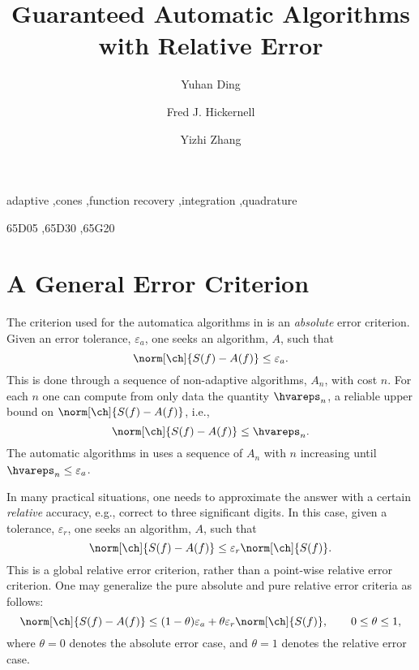\documentclass[]{elsarticle}
\theoremstyle{definition}
\theoremstyle{remark}
\begin{document}
\begin{frontmatter}

\title{Guaranteed Automatic Algorithms with Relative Error}
\author{Yuhan Ding}
\author{Fred J. Hickernell}
\author{Yizhi Zhang}
\address{Room E1-208, Department of Applied Mathematics, Illinois Institute of Technology,\\ 10 W.\ 32$^{\text{nd}}$ St., Chicago, IL 60616}
\begin{abstract}
\end{abstract}

\begin{keyword}
adaptive \sep cones \sep function recovery \sep integration \sep quadrature

\MSC[2010] 65D05 \sep 65D30 \sep 65G20

\end{keyword}
\end{frontmatter}


\section{A General Error Criterion} \label{relerrsec}

The criterion used for the automatica algorithms in \cite{HicEtal14b} is an \emph{absolute} error criterion. Given an error tolerance, $\varepsilon_a$, one seeks an algorithm, $A$, such that
\begin{equation} \label{abserrcrit}
\norm[\ch]{S(f)-A(f)} \le \varepsilon_a.
\end{equation}
This is done through a sequence of non-adaptive algorithms, $A_n$, with cost $n$.  For each $n$ one can compute from only data the quantity $\hvareps_n$, a reliable upper bound on $\norm[\ch]{S(f)-A(f)}$, i.e.,
\begin{equation} \label{hatvareps}
\norm[\ch]{S(f)-A(f)} \le \hvareps_n.
\end{equation}
The automatic algorithms in \cite{HicEtal14b} uses a sequence of $A_n$ with $n$ increasing until $\hvareps_n \le \varepsilon_a$.

In many practical situations, one needs to approximate the answer with a certain \emph{relative} accuracy, e.g., correct to three significant digits.  In this case, given a tolerance, $\varepsilon_r$, one seeks an algorithm, $A$, such that
\begin{equation} \label{globalrelerrcrit}
\norm[\ch]{S(f)-A(f)} \le \varepsilon_r \norm[\ch]{S(f)}.
\end{equation}
This is a global relative error criterion, rather than a point-wise relative error criterion.  One may generalize the pure absolute and pure relative error criteria as follows:
\begin{equation} \label{globalgenerrcrit}
\norm[\ch]{S(f)-A(f)} \le (1-\theta)\varepsilon_a + \theta \varepsilon_r \norm[\ch]{S(f)}, \qquad 0 \le \theta \le 1,
\end{equation}
where $\theta=0$ denotes the absolute error case, and $\theta=1$ denotes the relative error case.  
\end{document}
